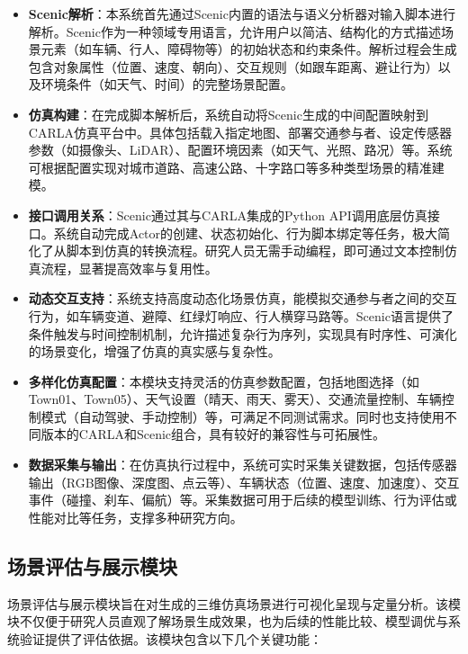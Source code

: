 \begin{itemize}
	\item \textbf{Scenic解析}：本系统首先通过Scenic内置的语法与语义分析器对输入脚本进行解析。Scenic作为一种领域专用语言，允许用户以简洁、结构化的方式描述场景元素（如车辆、行人、障碍物等）的初始状态和约束条件。解析过程会生成包含对象属性（位置、速度、朝向）、交互规则（如跟车距离、避让行为）以及环境条件（如天气、时间）的完整场景配置。
	
	\item \textbf{仿真构建}：在完成脚本解析后，系统自动将Scenic生成的中间配置映射到CARLA仿真平台中。具体包括载入指定地图、部署交通参与者、设定传感器参数（如摄像头、LiDAR）、配置环境因素（如天气、光照、路况）等。系统可根据配置实现对城市道路、高速公路、十字路口等多种类型场景的精准建模。
	
	\item \textbf{接口调用关系}：Scenic通过其与CARLA集成的Python API调用底层仿真接口。系统自动完成Actor的创建、状态初始化、行为脚本绑定等任务，极大简化了从脚本到仿真的转换流程。研究人员无需手动编程，即可通过文本控制仿真流程，显著提高效率与复用性。
	
	\item \textbf{动态交互支持}：系统支持高度动态化场景仿真，能模拟交通参与者之间的交互行为，如车辆变道、避障、红绿灯响应、行人横穿马路等。Scenic语言提供了条件触发与时间控制机制，允许描述复杂行为序列，实现具有时序性、可演化的场景变化，增强了仿真的真实感与复杂性。
	
	\item \textbf{多样化仿真配置}：本模块支持灵活的仿真参数配置，包括地图选择（如Town01、Town05）、天气设置（晴天、雨天、雾天）、交通流量控制、车辆控制模式（自动驾驶、手动控制）等，可满足不同测试需求。同时也支持使用不同版本的CARLA和Scenic组合，具有较好的兼容性与可拓展性。
	
	\item \textbf{数据采集与输出}：在仿真执行过程中，系统可实时采集关键数据，包括传感器输出（RGB图像、深度图、点云等）、车辆状态（位置、速度、加速度）、交互事件（碰撞、刹车、偏航）等。采集数据可用于后续的模型训练、行为评估或性能对比等任务，支撑多种研究方向。
	
\end{itemize}


\subsection{场景评估与展示模块}

场景评估与展示模块旨在对生成的三维仿真场景进行可视化呈现与定量分析。该模块不仅便于研究人员直观了解场景生成效果，也为后续的性能比较、模型调优与系统验证提供了评估依据。该模块包含以下几个关键功能：

